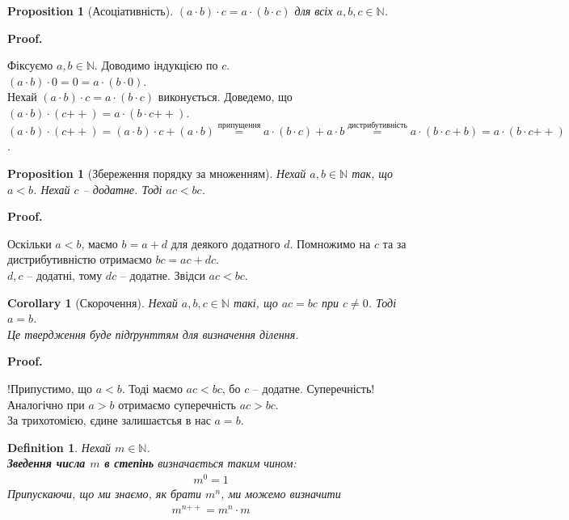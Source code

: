 \documentclass[a4paper, 14pt]{extarticle}
\makeatletter
\theoremstyle{theoremdd}
\theoremstyle{theoremdd}
\newtheorem{definition}[theorem]{Definition}
\theoremstyle{theoremdd}
\theoremstyle{theoremdd}
\theoremstyle{theoremdd}
\theoremstyle{theoremdd}
\theoremstyle{theoremdd}
\theoremstyle{theoremdd}
\theoremstyle{theoremdd}
\theoremstyle{theoremdd}
\newtheorem{proposition}[theorem]{Proposition}
\theoremstyle{theoremdd}
\theoremstyle{theoremdd}
\theoremstyle{theoremdd}
\theoremstyle{theoremdd}
\theoremstyle{theoremdd}
\newtheorem{corollary}[theorem]{Corollary}
\theoremstyle{theoremdd}
\renewenvironment{proof}[1][Proof.\\]{\par
\pushQED{\hfill \qed}%
\normalfont \topsep6\p@\@plus6\p@\relax
\trivlist
\item\relax
{\bfseries
#1\@addpunct{.}}\hspace\labelsep\ignorespaces
}{%
\popQED\endtrivlist\@endpefalse
}
\newcommand{\plusplus}{\!\!\mathrel{++}}
\makeatother
\begin{document}
\begin{proposition}[Асоціативність]
$(a \cdot b) \cdot c = a \cdot (b \cdot c)$ для всіх $a,b,c \in \mathbb{N}$.
\end{proposition}

\begin{proof}
Фіксуємо $a,b \in \mathbb{N}$. Доводимо індукцією по $c$.\\
$(a \cdot b) \cdot 0 = 0 = a \cdot (b \cdot 0)$.\\
Нехай $(a \cdot b) \cdot c = a \cdot (b \cdot c)$ виконується. Доведемо, що $(a \cdot b) \cdot (c \plusplus) = a \cdot (b \cdot c\plusplus)$.\\
$(a \cdot b) \cdot (c \plusplus) = (a \cdot b) \cdot c + (a \cdot b) \overset{\text{припущення}}{=} a \cdot (b \cdot c) + a \cdot b \overset{\text{дистрибутивність}}{=} a \cdot (b \cdot c + b) = a \cdot (b \cdot c \plusplus)$.
\end{proof}

\begin{proposition}[Збереження порядку за множенням]
Нехай $a,b \in \mathbb{N}$ так, що $a < b$. Нехай $c$ -- додатне. Тоді $ac < bc$.
\end{proposition}

\begin{proof}
Оскільки $a < b$, маємо $b = a+d$ для деякого додатного $d$. Помножимо на $c$ та за дистрибутивністю отримаємо $bc = ac + dc$.\\
$d,c$ -- додатні, тому $dc$ -- додатне. Звідси $ac < bc$.
\end{proof}

\begin{corollary}[Скорочення]
Нехай $a,b,c \in \mathbb{N}$ такі, що $ac = bc$ при $c \neq 0$. Тоді $a = b$.\\
\textit{Це твердження буде підґрунттям для визначення ділення.}
\end{corollary}

\begin{proof}
!Припустимо, що $a < b$. Тоді маємо $ac < bc$, бо $c$ -- додатне. Суперечність!\\
Аналогічно при $a > b$ отримаємо суперечність $ac > bc$.\\
За трихотомією, єдине залишаєтсья в нас $a = b$.
\end{proof}

\begin{definition}
Нехай $m \in \mathbb{N}$.\\
\textbf{Зведення числа $m$ в степінь} визначається таким чином:
\begin{align*}
m^0 = 1
\end{align*}
Припускаючи, що ми знаємо, як брати $m^n$, ми можемо визначити
\begin{align*}
m^{n\plusplus} = m^n \cdot m
\end{align*}
\end{definition}
\newpage
\end{document}
